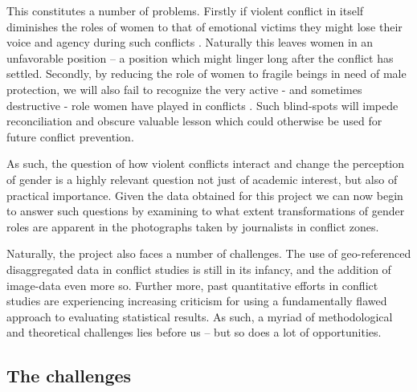 \documentclass[a4paper]{article}
\begin{document}
This constitutes a number of problems. Firstly if violent conflict in itself diminishes the roles of women to that of emotional victims they might lose their voice and agency during such conflicts \citep{hansen2000gender, hansen2000little}. Naturally this leaves women in an unfavorable position \citep[294-297]{hansen2000little} -- a position which might linger long after the conflict has settled. Secondly, by reducing the role of women to fragile beings in need of male protection, we will also fail to recognize the very active - and sometimes destructive - role women have played in conflicts \citep[66]{hansen2000gender}. Such blind-spots will impede reconciliation and obscure valuable lesson which could otherwise be used for future conflict prevention.\par

As such, the question of how violent conflicts interact and change the perception of gender is a highly relevant question not just of academic interest, but also of practical importance. Given the data obtained for this project we can now begin to answer such questions by examining to what extent transformations of gender roles are apparent in the photographs taken by journalists in conflict zones.\par

Naturally, the project also faces a number of challenges. The use of geo-referenced disaggregated data in conflict studies is still in its infancy, and the addition of image-data even more so. Further more, past quantitative efforts in conflict studies are experiencing increasing criticism for using a fundamentally flawed approach to evaluating statistical results. As such, a myriad of methodological and theoretical challenges lies before us -- but so does a lot of opportunities.\par


\subsection{The challenges}
\end{document}
